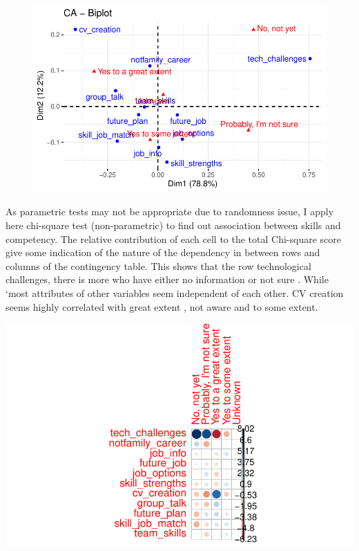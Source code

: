 \documentclass[
  12pt]{article}
\begin{document}
\begin{figure}[H]

{\centering \includegraphics{Journal_article_files/figure-pdf/unnamed-chunk-8-1.pdf}

}

\end{figure}

As parametric tests may not be appropriate due to randomness issue, I
apply here chi-square test (non-parametric) to find out association
between skills and competency. The relative contribution of each cell to
the total Chi-square score give some indication of the nature of the
dependency in between rows and columns of the contingency table. This
shows that the row technological challenges, there is more who have
either no information or not sure . While `most attributes of other
variables seem independent of each other. CV creation seems highly
correlated with great extent , not aware and to some extent.

\includegraphics{Journal_article_files/figure-pdf/unnamed-chunk-9-1.pdf}
\end{document}
